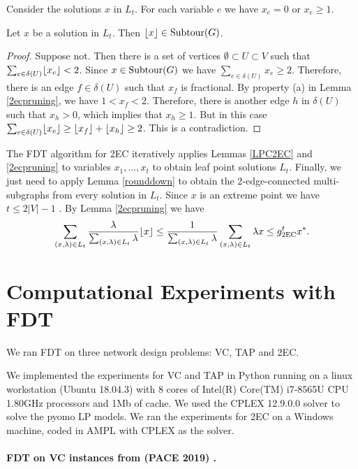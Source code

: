 Consider the solutions $x$ in $L_t$. For each variable $e$ we have $x_e=0$ or $x_e\geq 1$. 
\begin{lemma}\label{rounddown}
	Let $x$ be a solution in $L_t$. Then $\lfloor x\rfloor \in \operatorname{{Subtour}}(G)$. 
\end{lemma}
\begin{proof}
	Suppose not. Then there is a set of vertices $\emptyset \subset U \subset V$ such that $\sum_{e\in \delta(U)}\lfloor x_e\rfloor<2$. Since $x\in \operatorname{{Subtour}}(G)$ we have $\sum_{e\in \delta(U)}x_e \geq 2$. Therefore, there is an edge $f\in \delta(U)$ such that $x_f$ is fractional. By property (a) in Lemma \ref{2ecpruning}, we have $1<  x_f < 2$. Therefore, there is another edge $h$ in $\delta(U)$ such that $x_h>0$, which implies that $x_h\geq 1$. But in this case $\sum_{e\in \delta(U)}\lfloor x_e\rfloor\geq  \lfloor x_f\rfloor+\lfloor x_h\rfloor  \geq 2$. This is a contradiction.
\end{proof}

The FDT algorithm for 2EC iteratively applies Lemmas \ref{LPC2EC} and \ref{2ecpruning} to variables $x_1,\ldots,x_t$ to obtain leaf point solutions $L_t$. Finally, we just need to apply Lemma \ref{rounddown} to obtain the 2-edge-connected multi-subgraphs from every solution in $L_t$. Since $x$ is an extreme point we have $t\leq 2|V|-1$ \cite{boydpulley}. By Lemma \ref{2ecpruning} we have
\begin{align*}
\sum_{(x,\lambda)\in L_t} \frac{\lambda}{\sum_{(x,\lambda)\in L_t}\lambda} \floor{x} \leq \frac{1}{\sum_{(x,\lambda)\in L_t}\lambda} \sum_{(x,\lambda)\in L_t} \lambda {x} \leq g^t_{\2ec} x^*.
\end{align*}
\section{Computational Experiments with FDT}\label{sec:experiment}
We ran FDT on three network design problems: VC, TAP and 2EC. 

We implemented the experiments for VC and TAP in Python running on a linux workstation (Ubuntu 18.04.3) with 8 cores of Intel(R) Core(TM) i7-8565U CPU  1.80GHz processors and 1Mb of cache. We used the CPLEX 12.9.0.0 solver to solve the pyomo LP models. We ran the experiments for 2EC on a Windows machine, coded in AMPL with CPLEX as the solver.
\paragraph{FDT on VC instances from (PACE 2019) \cite{PACE}.}



